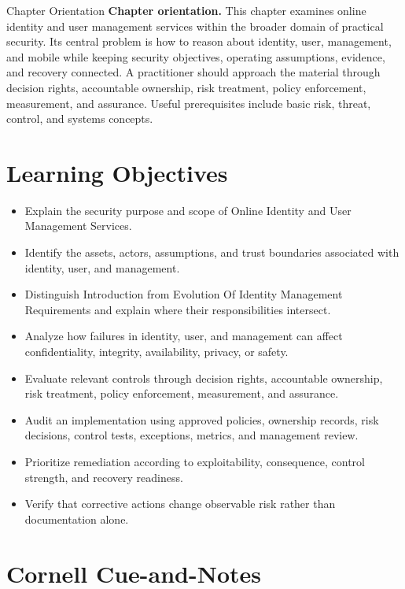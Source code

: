 \documentclass[11pt,letterpaper]{article}
\title{\CornellDocumentTitle}
\author{}
\date{}
\begin{document}
\maketitle
\begin{CornellOverviewBox}{Chapter Orientation}
\textbf{Chapter orientation.} This chapter examines online identity and user management services within the broader domain of practical security. Its central problem is how to reason about identity, user, management, and mobile while keeping security objectives, operating assumptions, evidence, and recovery connected. A practitioner should approach the material through decision rights, accountable ownership, risk treatment, policy enforcement, measurement, and assurance. Useful prerequisites include basic risk, threat, control, and systems concepts.
\end{CornellOverviewBox}
\section*{Learning Objectives}
\begin{itemize}
\item Explain the security purpose and scope of Online Identity and User Management Services.
\item Identify the assets, actors, assumptions, and trust boundaries associated with identity, user, and management.
\item Distinguish Introduction from Evolution Of Identity Management Requirements and explain where their responsibilities intersect.
\item Analyze how failures in identity, user, and management can affect confidentiality, integrity, availability, privacy, or safety.
\item Evaluate relevant controls through decision rights, accountable ownership, risk treatment, policy enforcement, measurement, and assurance.
\item Audit an implementation using approved policies, ownership records, risk decisions, control tests, exceptions, metrics, and management review.
\item Prioritize remediation according to exploitability, consequence, control strength, and recovery readiness.
\item Verify that corrective actions change observable risk rather than documentation alone.
\end{itemize}
\section*{Cornell Cue-and-Notes}
\end{document}

